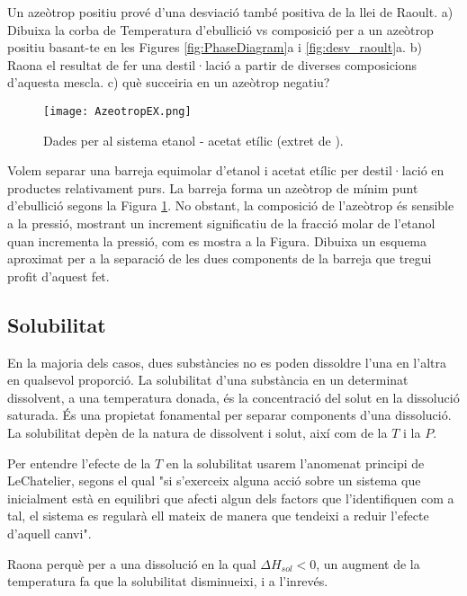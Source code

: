 \begin{exr}
Un azeòtrop positiu prové d'una desviació també positiva de la llei de Raoult. a) Dibuixa la corba de Temperatura d'ebullició vs composició per a un azeòtrop positiu basant-te en les Figures \ref{fig:PhaseDiagram}a i \ref{fig:desv_raoult}a. b) Raona el resultat de fer una destil·lació a partir de diverses composicions d'aquesta mescla. c) què succeiria en un azeòtrop negatiu?
\end{exr}
\begin{figure}[h]
\centering
\texttt{[image: AzeotropEX.png]}
\caption{Dades per al sistema etanol - acetat etílic (extret de \citep{Robin2016}).}
\label{fig:AzeotropEX}
\end{figure}
\begin{exr}
Volem separar una barreja equimolar d'etanol i acetat etílic per destil·lació en productes relativament purs. La barreja forma un azeòtrop de mínim punt d'ebullició segons la Figura \ref{fig:AzeotropEX}. No obstant, la composició de l'azeòtrop és sensible a la pressió, mostrant un increment significatiu de la fracció molar de l'etanol quan incrementa la pressió, com es mostra a la Figura. Dibuixa un esquema aproximat per a la separació de les dues components de la barreja que tregui profit d'aquest fet.
\end{exr}

\subsection{Solubilitat}

En la majoria dels casos, dues substàncies no es poden dissoldre l'una en l'altra en qualsevol proporció.
La solubilitat d'una substància en un determinat dissolvent, a una temperatura donada, és la concentració del solut en la dissolució saturada.
És una propietat fonamental per separar components d'una dissolució.
La solubilitat depèn de la natura de dissolvent i solut, així com de la $T$ i la $P$.

Per entendre l'efecte de la $T$ en la solubilitat usarem l'anomenat principi de LeChatelier, segons el qual "si s'exerceix alguna acció sobre un sistema que inicialment està en equilibri que afecti algun dels factors que l'identifiquen com a tal, el sistema es regularà ell mateix de manera que tendeixi a reduir l'efecte d'aquell canvi".
\begin{exr}
Raona perquè per a una dissolució en la qual $\Delta H_{sol} <0$, un augment de la temperatura fa que la solubilitat disminueixi, i a l'inrevés.
\end{exr}

